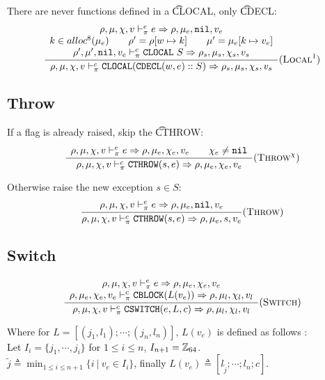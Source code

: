 There are never functions defined in a \t{CLOCAL}, only \t{CDECL}:
\[\dfrac{\begin{array}{c}
    \rho,\mu,\chi,v \vdash_\pi^e e \Rightarrow \rho,\mu_e,\texttt{nil},v_e \\
    k \in alloc^8(\mu_e) \qquad \rho' = \rho[w \mapsto k] \qquad \mu' = \mu_e[k \mapsto v_e] \\
    \rho',\mu',\texttt{nil},v_e \vdash_\pi^c \texttt{CLOCAL}\ S \Rightarrow \rho_s,\mu_s,\chi_s,v_s
\end{array}}{\rho,\mu,\chi,v \vdash_\pi^c \texttt{CLOCAL}(\texttt{CDECL}(w,e)::S) \Rightarrow \rho_s,\mu_s,\chi_s,v_s} (\textsc{Local}^1)\]

\subsection{Throw}
If a flag is already raised, skip the \t{CTHROW}:
\[\dfrac{\begin{array}{c}
    \rho,\mu,\chi,v \vdash_\pi^e e \Rightarrow \rho,\mu_e,\chi_e,v_e \qquad \chi_e\ne\texttt{nil}
\end{array}}{\rho,\mu,\chi,v \vdash_\pi^c \texttt{CTHROW}(s,e) \Rightarrow \rho,\mu_e,\chi_e,v_e} (\textsc{Throw}^\chi)\]

Otherwise raise the new exception \(s\in S\):
\[\dfrac{\begin{array}{c}
    \rho,\mu,\chi,v \vdash_\pi^e e \Rightarrow \rho,\mu_e,\texttt{nil},v_e
\end{array}}{\rho,\mu,\chi,v \vdash_\pi^c \texttt{CTHROW}(s,e) \Rightarrow \rho,\mu_e,s,v_e} (\textsc{Throw})\]

\subsection{Switch}

\[\dfrac{\begin{array}{c}
    \rho,\mu,\chi,v \vdash_\pi^e e \Rightarrow \rho,\mu_e,\chi_e,v_e \\
    \rho,\mu_e,\chi_e,v_e \vdash_\pi^c \texttt{CBLOCK}(L(v_e)) \Rightarrow \rho,\mu_l,\chi_l,v_l
\end{array}}{\rho,\mu,\chi,v \vdash_\pi^c \texttt{CSWITCH}(e, L, c) \Rightarrow \rho,\mu_l,\chi_l,v_l} (\textsc{Switch})\]

Where for \(L = [(j_1, l_1); \cdots; (j_n,l_n)]\), \(L(v_e)\) is defined as follows : \\
Let \(I_i =  \{ j_1, \cdots, j_i \}\) for \(1 \leq i \leq n\), \(I_{n+1} = \mathbb{Z}_{64}\). \\
\(\tilde{j} \triangleq \min_{1\leq i \leq n+1} \{ i\ |\ v_e\in I_i \}\), finally \(L(v_e) \triangleq [l_{\tilde{j}}; \cdots; l_n; c]\).

